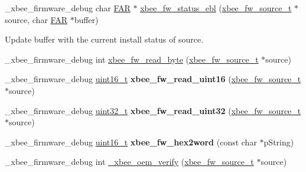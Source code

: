 \begin{DoxyCompactItemize}
\+\_\+xbee\+\_\+firmware\+\_\+debug char \hyperlink{group__hal_gaef060b3456fdcc093a7210a762d5f2ed}{F\+AR} $\ast$ \hyperlink{group__xbee__firmware_ga8bee6e4bb7564c51bb38129e97a12e99}{xbee\+\_\+fw\+\_\+status\+\_\+ebl} (\hyperlink{structxbee__fw__source__t}{xbee\+\_\+fw\+\_\+source\+\_\+t} $\ast$source, char \hyperlink{group__hal_gaef060b3456fdcc093a7210a762d5f2ed}{F\+AR} $\ast$buffer)
\begin{DoxyCompactList}\small\item\em \begin{DoxyVerb}  Update \a buffer with the current install status of \a source.\end{DoxyVerb}
 \end{DoxyCompactList}\item 
\+\_\+xbee\+\_\+firmware\+\_\+debug int \hyperlink{group__xbee__firmware_ga279def556401f533d798bb3896302ced}{xbee\+\_\+fw\+\_\+read\+\_\+byte} (\hyperlink{structxbee__fw__source__t}{xbee\+\_\+fw\+\_\+source\+\_\+t} $\ast$source)
\item 
\mbox{\label{group__xbee__firmware_ga746388cd011a0d01a71d8165f218ac0c}} 
\+\_\+xbee\+\_\+firmware\+\_\+debug \hyperlink{group__hal__dos_ga5a8b2dc9e45a9ee81a94ef304fb62505}{uint16\+\_\+t} {\bfseries xbee\+\_\+fw\+\_\+read\+\_\+uint16} (\hyperlink{structxbee__fw__source__t}{xbee\+\_\+fw\+\_\+source\+\_\+t} $\ast$source)
\item 
\mbox{\label{group__xbee__firmware_gac6ee0eef9cb2fad06cdb35e7efbfa4b7}} 
\+\_\+xbee\+\_\+firmware\+\_\+debug \hyperlink{group__hal__dos_ga09a1e304d66d35dd47daffee9731edaa}{uint32\+\_\+t} {\bfseries xbee\+\_\+fw\+\_\+read\+\_\+uint32} (\hyperlink{structxbee__fw__source__t}{xbee\+\_\+fw\+\_\+source\+\_\+t} $\ast$source)
\item 
\mbox{\label{group__xbee__firmware_ga435d274639214c2d05e85602bb5753b0}} 
\+\_\+xbee\+\_\+firmware\+\_\+debug \hyperlink{group__hal__dos_ga5a8b2dc9e45a9ee81a94ef304fb62505}{uint16\+\_\+t} {\bfseries xbee\+\_\+fw\+\_\+hex2word} (const char $\ast$p\+String)
\item 
\+\_\+xbee\+\_\+firmware\+\_\+debug int \hyperlink{group__xbee__firmware_ga06368ad0d6cc0d4e92dbf36f8b233f90}{\+\_\+xbee\+\_\+oem\+\_\+verify} (\hyperlink{structxbee__fw__source__t}{xbee\+\_\+fw\+\_\+source\+\_\+t} $\ast$source)
\item 
\mbox{\label{group__xbee__firmware_ga2ab185ce19159e57ca4666300be1a94b}} 

\end{DoxyCompactItemize}
